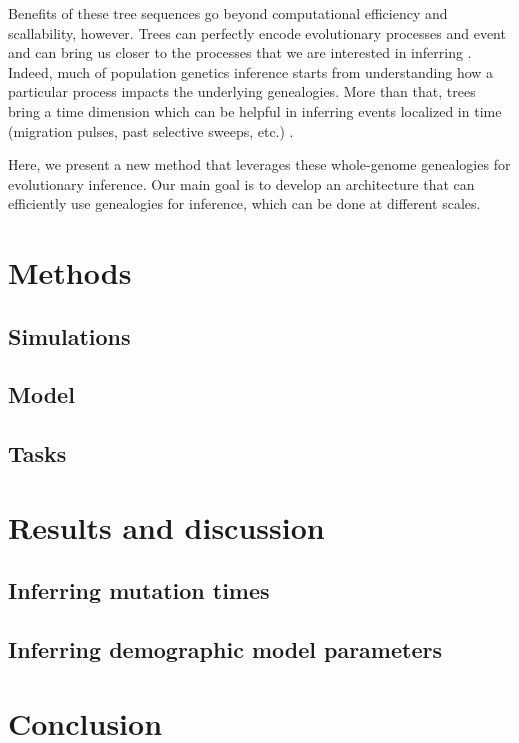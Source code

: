 Benefits of these tree sequences go beyond computational efficiency and scallability, however.
Trees can perfectly encode evolutionary processes and event and can bring us closer to the processes that we are interested in inferring \citep{rasmussen_genome-wide_2014}.
Indeed, much of population genetics inference starts from understanding how a particular process impacts the underlying genealogies.
More than that, trees bring a time dimension which can be helpful in inferring events localized in time (\eg migration pulses, past selective sweeps, etc.) \citep{speidel_inferring_2021}.

Here, we present a new method that leverages these whole-genome genealogies for evolutionary inference.
Our main goal is to develop an architecture that can efficiently use genealogies for inference,
which can be done at different scales.


\section{Methods} \label{sec:methods}

\subsection{Simulations}

\subsection{Model}

\subsection{Tasks}

\section{Results and discussion}

\subsection{Inferring mutation times}

\subsection{Inferring demographic model parameters}

\section{Conclusion}
